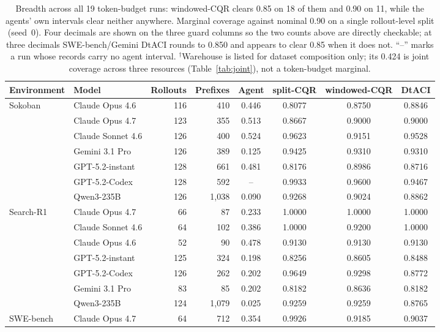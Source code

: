 \documentclass{article}
\begin{document}
\begin{table}[t]
\centering
\caption{Breadth across all 19 token-budget runs: windowed-CQR clears 0.85 on 18 of them and 0.90 on 11, while the agents' own intervals clear neither anywhere. Marginal coverage against nominal 0.90 on a single rollout-level split (seed~0). Four decimals are shown on the three guard columns so the two counts above are directly checkable; at three decimals SWE-bench/Gemini DtACI rounds to 0.850 and appears to clear 0.85 when it does not. ``--'' marks a run whose records carry no agent interval. $^{\dagger}$Warehouse is listed for dataset composition only; its 0.424 is joint coverage across three resources (Table~\ref{tab:joint}), not a token-budget marginal.}
\label{tab:allruns}
\footnotesize
\begin{tabular}{@{}llrrcccc@{}}
\toprule
Environment & Model & Rollouts & Prefixes & Agent & split-CQR & windowed-CQR & DtACI \\
\midrule
\multirow{7}{*}{Sokoban}
 & Claude Opus 4.6 & 116 & 410 & 0.446 & 0.8077 & 0.8750 & 0.8846 \\
 & Claude Opus 4.7 & 123 & 355 & 0.513 & 0.8667 & 0.9000 & 0.9000 \\
 & Claude Sonnet 4.6 & 126 & 400 & 0.524 & 0.9623 & 0.9151 & 0.9528 \\
 & Gemini 3.1 Pro & 126 & 389 & 0.125 & 0.9425 & 0.9310 & 0.9310 \\
 & GPT-5.2-instant & 128 & 661 & 0.481 & 0.8176 & 0.8986 & 0.8716 \\
 & GPT-5.2-Codex & 128 & 592 & -- & 0.9933 & 0.9600 & 0.9467 \\
 & Qwen3-235B & 126 & 1{,}038 & 0.090 & 0.9268 & 0.9024 & 0.8862 \\
\midrule
\multirow{7}{*}{Search-R1}
 & Claude Opus 4.7 & 66 & 87 & 0.233 & 1.0000 & 1.0000 & 1.0000 \\
 & Claude Sonnet 4.6 & 64 & 102 & 0.386 & 1.0000 & 0.9200 & 1.0000 \\
 & Claude Opus 4.6 & 52 & 90 & 0.478 & 0.9130 & 0.9130 & 0.9130 \\
 & GPT-5.2-instant & 125 & 324 & 0.198 & 0.8256 & 0.8605 & 0.8488 \\
 & GPT-5.2-Codex & 126 & 262 & 0.202 & 0.9649 & 0.9298 & 0.8772 \\
 & Gemini 3.1 Pro & 83 & 85 & 0.202 & 0.8182 & 0.8636 & 0.8182 \\
 & Qwen3-235B & 124 & 1{,}079 & 0.025 & 0.9259 & 0.9259 & 0.8765 \\
\midrule
\multirow{5}{*}{SWE-bench}
 & Claude Opus 4.7 & 64 & 712 & 0.354 & 0.9926 & 0.9185 & 0.9037 \\

\end{tabular}
\end{table}
\end{document}
